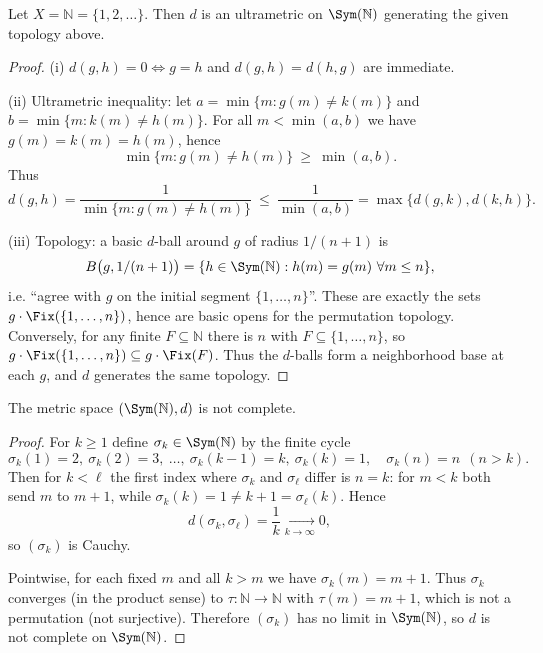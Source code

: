 \begin{lemma}
    Let $X=\mathbb{N}=\{1,2,\dots\}$.
    Then $d$ is an ultrametric on $\Sym(\mathbb{N})$ generating the given topology above.
\end{lemma}

\begin{proof}
    (i) $d(g,h)=0 \Leftrightarrow g=h$ and $d(g,h)=d(h,g)$ are immediate.

    (ii) Ultrametric inequality: let $a=\min\{m: g(m)\neq k(m)\}$ and
    $b=\min\{m: k(m)\neq h(m)\}$. For all $m<\min(a,b)$ we have
    $g(m)=k(m)=h(m)$, hence
    \[
        \min\{m: g(m)\neq h(m)\}\ \ge\ \min(a,b).
    \]
    Thus
    \[
        d(g,h)=\frac{1}{\min\{m: g(m)\neq h(m)\}}\ \le\ \frac{1}{\min(a,b)}
        =\max\{d(g,k),d(k,h)\}.
    \]

    (iii) Topology: a basic $d$-ball around $g$ of radius $1/(n+1)$ is
    \[
        B\bigl(g,1/(n+1)\bigr)=\{h\in\Sym(\mathbb{N}): h(m)=g(m)\ \forall m\le n\},
    \]
    i.e. “agree with $g$ on the initial segment $\{1,\dots,n\}$”.
    These are exactly the sets $g\cdot \Fix(\{1,\dots,n\})$, hence are basic opens
    for the permutation topology. Conversely, for any finite $F\subseteq\mathbb{N}$
    there is $n$ with $F\subseteq\{1,\dots,n\}$, so $g\cdot\Fix(\{1,\dots,n\})\subseteq
        g\cdot\Fix(F)$. Thus the $d$-balls form a neighborhood base at each $g$, and $d$
    generates the same topology.
\end{proof}

\begin{lemma}
    The metric space $(\Sym(\mathbb{N}),d)$ is not complete.
\end{lemma}

\begin{proof}
    For $k\ge1$ define $\sigma_k\in\Sym(\mathbb{N})$ by the finite cycle
    \[
        \sigma_k(1)=2,\ \sigma_k(2)=3,\ \dots,\ \sigma_k(k-1)=k,\ \sigma_k(k)=1,
        \quad \sigma_k(n)=n\ \ (n>k).
    \]
    Then for $k<\ell$ the first index where $\sigma_k$ and $\sigma_\ell$ differ is $n=k$:
    for $m<k$ both send $m$ to $m+1$, while
    $\sigma_k(k)=1\neq k+1=\sigma_\ell(k)$. Hence
    \[
        d(\sigma_k,\sigma_\ell)=\frac{1}{k}\xrightarrow[k\to\infty]{}0,
    \]
    so $(\sigma_k)$ is Cauchy.

    Pointwise, for each fixed $m$ and all $k>m$ we have $\sigma_k(m)=m+1$. Thus
    $\sigma_k$ converges (in the product sense) to $\tau:\mathbb{N}\to\mathbb{N}$ with
    $\tau(m)=m+1$, which is not a permutation (not surjective). Therefore $(\sigma_k)$
    has no limit in $\Sym(\mathbb{N})$, so $d$ is not complete on $\Sym(\mathbb{N})$.
\end{proof}


